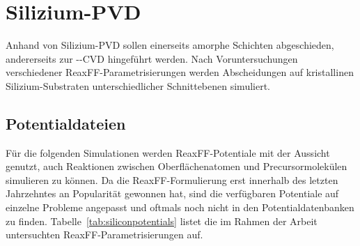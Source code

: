 \section{Silizium-PVD}
\label{siliconpvd}

Anhand von Silizium-PVD sollen einerseits amorphe Schichten abgeschieden, andererseits zur --CVD hingeführt werden.
Nach Voruntersuchungen verschiedener ReaxFF-Para\-metrisierungen werden Abscheidungen auf kristallinen Silizium-Substraten unterschiedlicher Schnittebenen simuliert.

\subsection{Potentialdateien}

Für die folgenden Simulationen werden ReaxFF-Potentiale mit der Aussicht genutzt, auch Reaktionen zwischen Oberflächenatomen und Precursormolekülen simulieren zu können.
Da die ReaxFF-Formulierung erst innerhalb des letzten Jahrzehntes an Popularität gewonnen hat, sind die verfügbaren Potentiale auf einzelne Probleme angepasst und oftmals noch nicht in den Potentialdatenbanken zu finden.
Tabelle~\ref{tab:siliconpotentials} listet die im Rahmen der Arbeit untersuchten ReaxFF-Parametrisierungen auf.

